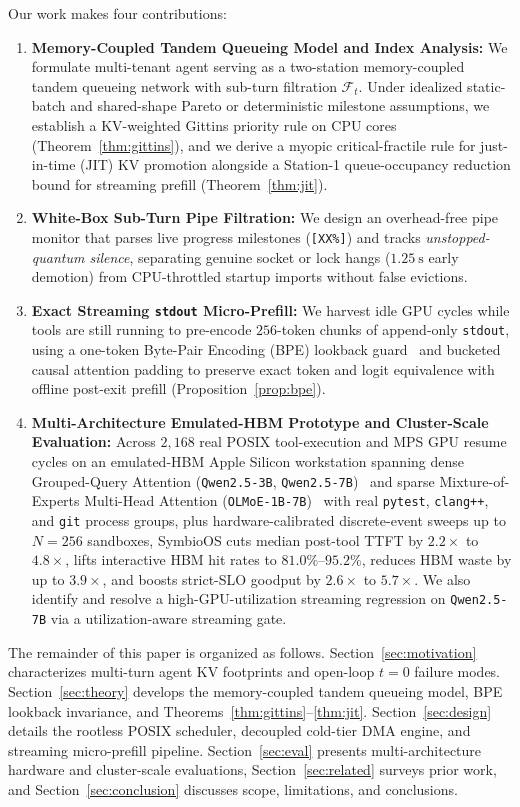 \documentclass[10pt,journal,compsoc]{IEEEtran}
\theoremstyle{definition}
\theoremstyle{remark}
\newcommand{\SymbioOS}{\textup{\textsc{SymbioOS}}}
\def\SymbioOS{SymbioOS}%
\begin{document}
Our work makes four contributions:
\begin{enumerate}
\item \textbf{Memory-Coupled Tandem Queueing Model and Index Analysis:} We formulate multi-tenant agent serving as a two-station memory-coupled tandem queueing network with sub-turn filtration $\mathcal{F}_t$. Under idealized static-batch and shared-shape Pareto or deterministic milestone assumptions, we establish a KV-weighted Gittins priority rule on CPU cores (Theorem~\ref{thm:gittins}), and we derive a myopic critical-fractile rule for just-in-time (JIT) KV promotion alongside a Station-1 queue-occupancy reduction bound for streaming prefill (Theorem~\ref{thm:jit}).
\item \textbf{White-Box Sub-Turn Pipe Filtration:} We design an overhead-free pipe monitor that parses live progress milestones (\texttt{[XX\%]}) and tracks \emph{unstopped-quantum silence}, separating genuine socket or lock hangs ($1.25~\mathrm{s}$ early demotion) from CPU-throttled startup imports without false evictions.
\item \textbf{Exact Streaming \texttt{stdout} Micro-Prefill:} We harvest idle GPU cycles while tools are still running to pre-encode $256$-token chunks of append-only \texttt{stdout}, using a one-token Byte-Pair Encoding (BPE) lookback guard~\cite{sennrich2016bpe} and bucketed causal attention padding to preserve exact token and logit equivalence with offline post-exit prefill (Proposition~\ref{prop:bpe}).
\item \textbf{Multi-Architecture Emulated-HBM Prototype and Cluster-Scale Evaluation:} Across $2{,}168$ real POSIX tool-execution and MPS GPU resume cycles on an emulated-HBM Apple Silicon workstation spanning dense Grouped-Query Attention (\texttt{Qwen2.5-3B}, \texttt{Qwen2.5-7B})~\cite{qwen2025qwen25} and sparse Mixture-of-Experts Multi-Head Attention (\texttt{OLMoE-1B-7B})~\cite{muennighoff2025olmoe} with real \texttt{pytest}, \texttt{clang++}, and \texttt{git} process groups, plus hardware-calibrated discrete-event sweeps up to $N = 256$ sandboxes, \SymbioOS{} cuts median post-tool TTFT by $2.2\times$ to $4.8\times$, lifts interactive HBM hit rates to $81.0\%$--$95.2\%$, reduces HBM waste by up to $3.9\times$, and boosts strict-SLO goodput by $2.6\times$ to $5.7\times$. We also identify and resolve a high-GPU-utilization streaming regression on \texttt{Qwen2.5-7B} via a utilization-aware streaming gate.
\end{enumerate}

The remainder of this paper is organized as follows. Section~\ref{sec:motivation} characterizes multi-turn agent KV footprints and open-loop $t = 0$ failure modes. Section~\ref{sec:theory} develops the memory-coupled tandem queueing model, BPE lookback invariance, and Theorems~\ref{thm:gittins}--\ref{thm:jit}. Section~\ref{sec:design} details the rootless POSIX scheduler, decoupled cold-tier DMA engine, and streaming micro-prefill pipeline. Section~\ref{sec:eval} presents multi-architecture hardware and cluster-scale evaluations, Section~\ref{sec:related} surveys prior work, and Section~\ref{sec:conclusion} discusses scope, limitations, and conclusions.
\end{document}
